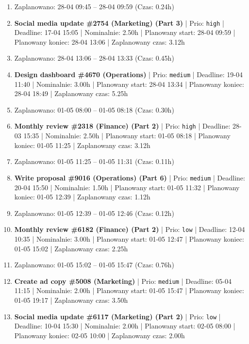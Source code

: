 {\begin{enumerate}
  \item [\textbf{PRZERWA}] Zaplanowano: 28-04 09:45 -- 28-04 09:59 (Czas: 0.24h)
  \item [\textbf{14611}] \textbf{Social media update \#2754 (Marketing) (Part 3)} | Prio: \texttt{high} | Deadline: 17-04 15:05 | Nominalnie: 2.50h | Planowany start: 28-04 09:59 | Planowany koniec: 28-04 13:06 | Zaplanowany czas: 3.12h
  \item [\textbf{PRZERWA}] Zaplanowano: 28-04 13:06 -- 28-04 13:33 (Czas: 0.45h)
  \item [\textbf{14676}] \textbf{Design dashboard \#4670 (Operations)} | Prio: \texttt{medium} | Deadline: 19-04 11:40 | Nominalnie: 3.00h | Planowany start: 28-04 13:34 | Planowany koniec: 28-04 18:49 | Zaplanowany czas: 5.25h
  \item [\textbf{PRZERWA}] Zaplanowano: 01-05 08:00 -- 01-05 08:18 (Czas: 0.30h)
  \item [\textbf{14618}] \textbf{Monthly review \#2318 (Finance) (Part 2)} | Prio: \texttt{high} | Deadline: 28-03 15:35 | Nominalnie: 2.50h | Planowany start: 01-05 08:18 | Planowany koniec: 01-05 11:25 | Zaplanowany czas: 3.12h
  \item [\textbf{PRZERWA}] Zaplanowano: 01-05 11:25 -- 01-05 11:31 (Czas: 0.11h)
  \item [\textbf{14662}] \textbf{Write proposal \#9016 (Operations) (Part 6)} | Prio: \texttt{medium} | Deadline: 20-04 15:50 | Nominalnie: 1.50h | Planowany start: 01-05 11:32 | Planowany koniec: 01-05 12:39 | Zaplanowany czas: 1.12h
  \item [\textbf{PRZERWA}] Zaplanowano: 01-05 12:39 -- 01-05 12:46 (Czas: 0.12h)
  \item [\textbf{14690}] \textbf{Monthly review \#6182 (Finance) (Part 2)} | Prio: \texttt{low} | Deadline: 12-04 10:35 | Nominalnie: 3.00h | Planowany start: 01-05 12:47 | Planowany koniec: 01-05 15:02 | Zaplanowany czas: 2.25h
  \item [\textbf{PRZERWA}] Zaplanowano: 01-05 15:02 -- 01-05 15:47 (Czas: 0.76h)
  \item [\textbf{14666}] \textbf{Create ad copy \#5008 (Marketing)} | Prio: \texttt{medium} | Deadline: 05-04 11:15 | Nominalnie: 2.00h | Planowany start: 01-05 15:47 | Planowany koniec: 01-05 19:17 | Zaplanowany czas: 3.50h
  \item [\textbf{14700}] \textbf{Social media update \#6117 (Marketing) (Part 2)} | Prio: \texttt{low} | Deadline: 10-04 15:30 | Nominalnie: 2.00h | Planowany start: 02-05 08:00 | Planowany koniec: 02-05 10:00 | Zaplanowany czas: 2.00h

\end{enumerate}}
